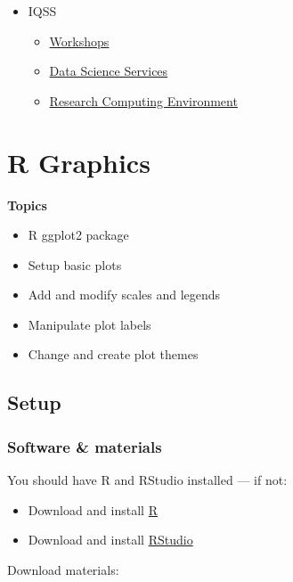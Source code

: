 \documentclass[]{book}
\providecommand{\tightlist}{%
  \setlength{\itemsep}{0pt}\setlength{\parskip}{0pt}}
\begin{document}
\begin{itemize}
\tightlist
\item
  IQSS

  \begin{itemize}
  \tightlist
  \item
    \href{https://dss.iq.harvard.edu/workshop-materials}{Workshops}
  \item
    \href{https://dss.iq.harvard.edu/}{Data Science Services}
  \item
    \href{https://iqss.github.io/dss-rce/}{Research Computing
    Environment}
  \end{itemize}
\end{itemize}

\chapter{R Graphics}\label{r-graphics}

\textbf{Topics}

\begin{itemize}
\tightlist
\item
  R ggplot2 package
\item
  Setup basic plots
\item
  Add and modify scales and legends
\item
  Manipulate plot labels
\item
  Change and create plot themes
\end{itemize}

\section{Setup}\label{setup-2}

\subsection{Software \& materials}\label{software-materials-2}

You should have R and RStudio installed --- if not:

\begin{itemize}
\tightlist
\item
  Download and install \href{http://cran.r-project.org}{R}
\item
  Download and install
  \href{https://www.rstudio.com/products/rstudio/download/\#download}{RStudio}
\end{itemize}

Download materials:
\end{document}
